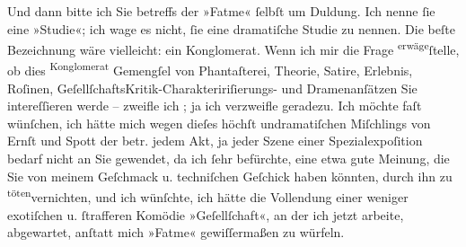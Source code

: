 \begin{ledgroupsized}[t]{13cm}
           \pstart
           Und dann bitte ich Sie \introOben{}betreffs\introOben{} der »Fatme« ſelbſt  um
                    Duldung. Ich nenne ſie eine »Studie«; ich wage es nicht, ſie eine dramatiſche
                    Studie zu nennen. Die beſte Bezeichnung wäre vielleicht: ein Konglomerat. Wenn
                    ich \introOben{}mir\introOben{} die Frage \substVorne{}\textsuperscript{erwäge}{\allowbreak}\substDazwischen{}ſtelle\substHinten{}, ob dies \substVorne{}\textsuperscript{Konglomerat}{\allowbreak}\substDazwischen{} Gemengſel\substHinten{} von  Phantaſterei, \introOben{}Theorie, \introOben{}{ }Satire, \introOben{}Erlebnis\introOben{},
                    Roſinen, \introOben{}Geſellſchafts\introOben{}Kritik-\introOben{}Charakteririſierungs-\introOben{} und Dramenanſätzen Sie intereſſieren werde –
                         zweifle ich ; ja ich verzweifle geradezu. Ich
                    möchte faſt wünſchen, ich hätte mich \introOben{}wegen\introOben{} dieſes \introOben{}höchſt undramatiſchen\introOben{} Miſchlings von Ernſt und Spott
                        \introOben{}der betr.  jedem Akt, ja jeder Szene  einer
                        Spezialexpoſition  bedarf\introOben{}{ } nicht an Sie gewendet, da ich ſehr
                    befürchte, eine etwa gute Meinung, die Sie von meinem Geſchmack \introOben{}u. techniſchen Geſchick\introOben{} haben könnten, durch \introOben{}ihn\introOben{} zu \substVorne{}\textsuperscript{töten}\substDazwischen{}vernichten\substHinten{}, und ich wünſchte, ich hätte die Vollendung einer \introOben{}weniger exotiſchen u. ſtrafferen\introOben{} Komödie »Geſellſchaft«, an der ich jetzt arbeite, abgewartet,
                    anſtatt mich »Fatme« \introOben{}gewiſſermaßen\introOben{} zu würfeln.\pend
           \pstart

\end{ledgroupsized}
